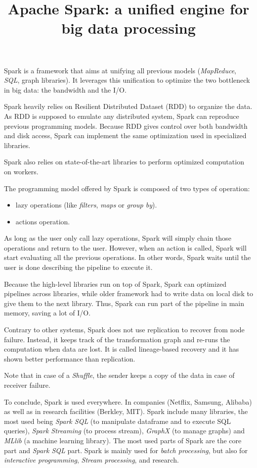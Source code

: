 \documentclass{article}
\title{Apache Spark: a unified engine for big data processing}
\begin{document}
\maketitle

Spark is a framework that aims at unifying all previous models (\textit{MapReduce}, \textit{SQL}, graph libraries).
It leverages this unification to optimize the two bottleneck in big data: the bandwidth and the I/O.

Spark heavily relies on Resilient Distributed Dataset (RDD) to organize the data.
As RDD is supposed to emulate any distributed system, Spark can reproduce previous programming models.
Because RDD gives control over both bandwidth and disk access, Spark can implement the same optimization used
in specialized libraries.

Spark also relies on state-of-the-art libraries to perform optimized computation on workers.

The programming model offered by Spark is composed of two types of operation:
\begin{itemize}
	\item lazy operations (like \textit{filters}, \textit{maps} or \textit{group by}).
	\item actions operation.
\end{itemize}

As long as the user only call lazy operations, Spark will simply chain those operations and return to the user.
However, when an action is called, Spark will start evaluating all the previous operations.
In other words, Spark waits until the user is done describing the pipeline to execute it.

Because the high-level libraries run on top of Spark, Spark can optimized pipelines across libraries,
while older framework had to write data on local disk to give them to the next library.
Thus, Spark can run part of the pipeline in main memory, saving a lot of I/O.

Contrary to other systems, Spark does not use replication to recover from node failure. Instead, it keeps track of the
transformation graph and re-runs the computation when data are lost.
It is called lineage-based recovery and it has shown better performance than replication.

Note that in case of a \textit{Shuffle}, the sender keeps a copy of the data in case of receiver failure.

To conclude, Spark is used everywhere. In companies (Netflix, Samsung, Alibaba) as well as in research facilities (Berkley, MIT).
Spark include many libraries, the most used being \textit{Spark SQL} (to manipulate dataframe and to execute SQL queries), \textit{Spark Streaming} (to process stream),
\textit{GraphX} (to manage graphs) and \textit{MLlib} (a machine learning library).
The most used parts of Spark are the core part and \textit{Spark SQL} part.
Spark is mainly used for \textit{batch processing}, but also for \textit{interactive programming}, \textit{Stream processing}, and research.
\end{document}
